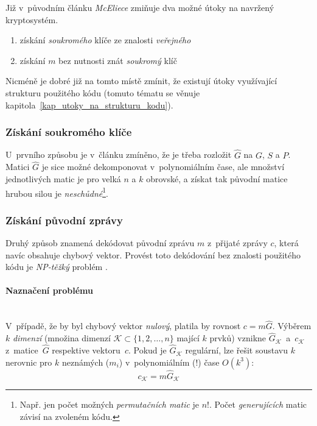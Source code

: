 \documentclass[thesis=M,czech,hidelinks]{FITthesis}[2012/06/26]
\newcommand{\0}{{\textcolor[gray]{0.75}{0}}}
\begin{document}
Již v~původním článku \cite{McEliece} \emph{McEliece} zmiňuje dva možné útoky na
navržený kryptosystém.

\begin{enumerate}
    \item získání \emph{soukromého} klíče ze znalosti \emph{veřejného}
    \item získání $m$ bez nutnosti znát \emph{soukromý} klíč
\end{enumerate}

Nicméně je dobré již na tomto místě zmínit, že existují útoky využívající
strukturu použitého kódu (tomuto tématu se věnuje
kapitola~\ref{kap_utoky_na_strukturu_kodu}).

\subsubsection{Získání soukromého klíče}

U~prvního způsobu je v~článku zmíněno, že je třeba rozložit $\hat{G}$ na $G$,
$S$ a $P$.  Matici $\hat{G}$ je sice možné dekomponovat v~polynomiálním čase,
ale množství jednotlivých matic je pro velká $n$ a $k$ obrovské, a získat tak
původní matice hrubou silou je \emph{neschůdné}\footnote{
    Např. jen počet možných \emph{permutačních matic} je $n!$. Počet
    \emph{generujících} matic závisí na zvoleném kódu.
}.


\subsubsection{Získání původní zprávy}

Druhý způsob znamená dekódovat původní zprávu $m$ z~přijaté zprávy $c$, která
navíc obsahuje chybový vektor. Provést toto dekódování bez znalosti použitého
kódu je \emph{NP-těžký} problém \cite{Berlekamp1}.

\paragraph{Naznačení problému} \hfil \\
V~případě, že by byl chybový vektor \emph{nulový}, platila by rovnost
$c = m\hat{G}$. Výběrem $k$ \emph{dimenzí} (množina dimenzí
$\mathcal{K} \subset \{1,2,\ldots,n\}$ mající $k$ prvků) vznikne
$\hat{G}_{\mathcal{K}}$~a~$c_{\mathcal{K}}$ z~matice~$\hat{G}$ respektive
vektoru~$c$. Pokud je $\hat{G}_{\mathcal{K}}$ regulární, lze řešit soustavu
$k$ nerovnic pro $k$ neznámých ($m_i$) v~polynomiálním (!) čase
$O\left(k^3\right)$:
$$ c_{\mathcal{K}} = m \hat{G}_{\mathcal{K}} $$
\end{document}
